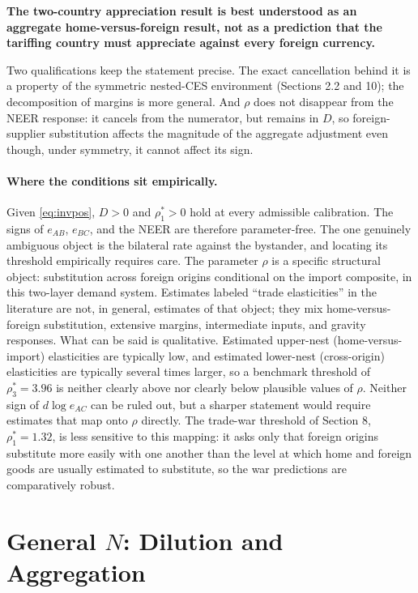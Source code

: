 \documentclass[11pt]{article}
\begin{document}
\begin{center}
\textbf{The two-country appreciation result is best understood as an aggregate home-versus-foreign result, not as a prediction that the tariffing country must appreciate against every foreign currency.}
\end{center}

\noindent Two qualifications keep the statement precise. The exact cancellation behind it is a property of the symmetric nested-CES environment (Sections 2.2 and 10); the decomposition of margins is more general. And $\rho$ does not disappear from the NEER response: it cancels from the numerator, but remains in $D$, so foreign-supplier substitution affects the magnitude of the aggregate adjustment even though, under symmetry, it cannot affect its sign.

\paragraph{Where the conditions sit empirically.} Given \eqref{eq:invpos}, $D > 0$ and $\rho_1^* > 0$ hold at every admissible calibration. The signs of $e_{AB}$, $e_{BC}$, and the NEER are therefore parameter-free. The one genuinely ambiguous object is the bilateral rate against the bystander, and locating its threshold empirically requires care. The parameter $\rho$ is a specific structural object: substitution across foreign origins conditional on the import composite, in this two-layer demand system. Estimates labeled ``trade elasticities'' in the literature are not, in general, estimates of that object; they mix home-versus-foreign substitution, extensive margins, intermediate inputs, and gravity responses. What can be said is qualitative. Estimated upper-nest (home-versus-import) elasticities are typically low, and estimated lower-nest (cross-origin) elasticities are typically several times larger, so a benchmark threshold of $\rho_3^* = 3.96$ is neither clearly above nor clearly below plausible values of $\rho$. Neither sign of $d\log e_{AC}$ can be ruled out, but a sharper statement would require estimates that map onto $\rho$ directly. The trade-war threshold of Section 8, $\rho_1^* = 1.32$, is less sensitive to this mapping: it asks only that foreign origins substitute more easily with one another than the level at which home and foreign goods are usually estimated to substitute, so the war predictions are comparatively robust.

\section{General $N$: Dilution and Aggregation}
\end{document}
